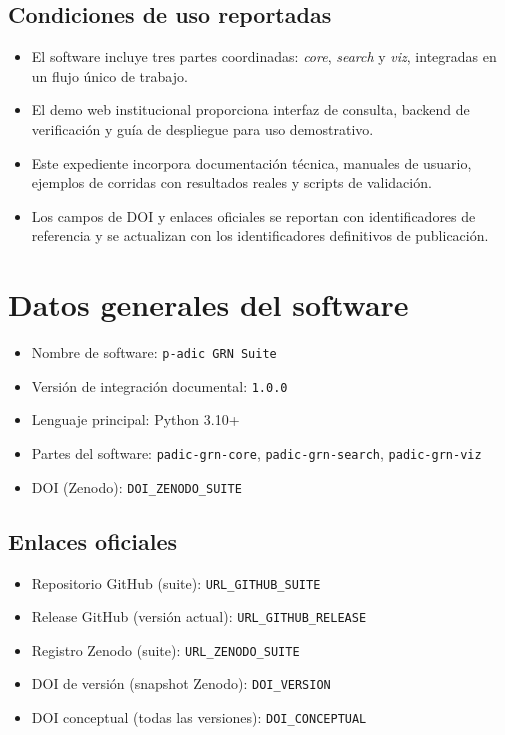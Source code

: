 \documentclass[11pt]{article}
\begin{document}
\subsection*{Condiciones de uso reportadas}
\begin{itemize}
  \item El software incluye tres partes coordinadas: \textit{core},
  \textit{search} y \textit{viz}, integradas en un flujo único de trabajo.
  \item El demo web institucional proporciona interfaz de consulta, backend de
  verificación y guía de despliegue para uso demostrativo.
  \item Este expediente incorpora documentación técnica, manuales de usuario,
  ejemplos de corridas con resultados reales y scripts de validación.
  \item Los campos de DOI y enlaces oficiales se reportan con identificadores
  de referencia y se actualizan con los identificadores definitivos de
  publicación.
\end{itemize}

\section{Datos generales del software}
\begin{itemize}
  \item Nombre de software: \texttt{p-adic GRN Suite}
  \item Versión de integración documental: \texttt{1.0.0}
  \item Lenguaje principal: Python 3.10+
  \item Partes del software: \texttt{padic-grn-core}, \texttt{padic-grn-search}, \texttt{padic-grn-viz}
  \item DOI (Zenodo): \texttt{DOI\_ZENODO\_SUITE}
\end{itemize}

\subsection{Enlaces oficiales}
\begin{itemize}
  \item Repositorio GitHub (suite): \texttt{URL\_GITHUB\_SUITE}
  \item Release GitHub (versión actual): \texttt{URL\_GITHUB\_RELEASE}
  \item Registro Zenodo (suite): \texttt{URL\_ZENODO\_SUITE}
  \item DOI de versión (snapshot Zenodo): \texttt{DOI\_VERSION}
  \item DOI conceptual (todas las versiones): \texttt{DOI\_CONCEPTUAL}
\end{itemize}
\end{document}

